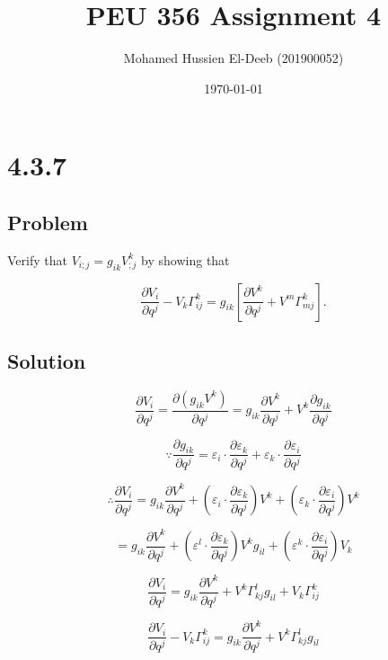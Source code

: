 \documentclass[12pt]{article}
\title{PEU 356 Assignment 4}
\author{Mohamed Hussien El-Deeb (201900052)}
\date{\today}
\begin{document}
\maketitle
\tableofcontents
\hypersetup{linkcolor=RoyalBlue4}

\newpage
\section{4.3.7}

\subsection{Problem}

Verify that \(V_{i ; j}=g_{i k} V_{; j}^k\) by showing that

\[
    \frac{\partial V_i}{\partial q^j}-V_k \Gamma_{i j}^k=g_{i k}\left[\frac{\partial V^k}{\partial q^j}+V^m \Gamma_{m j}^k\right] .
\]

\subsection{Solution}

\[
    \frac{\partial V_i}{\partial q^j} = \frac{\partial \left(g_{ik} V^k\right) }{\partial q^j}
    = g_{ik} \frac{\partial V^k}{\partial q^j} + V^k \frac{\partial g_{ik}}{\partial q^j}
\]

\[
    \because \frac{\partial g_{ik}}{\partial q^j} = \varepsilon_{i} \cdot \frac{\partial \varepsilon_k}{\partial q^j} + \varepsilon_k \cdot \frac{\partial \varepsilon_i}{\partial q^j}
\]

\[
    \therefore \frac{\partial V_i}{\partial q^j} = g_{ik} \frac{\partial V^k}{\partial q^j}
    + \left(\varepsilon_i \cdot \frac{\partial \varepsilon_k}{\partial q^j}\right) V^k
    + \left(\varepsilon_k \cdot \frac{\partial \varepsilon_i}{\partial q^j}\right) V^k
\]

\[
    = g_{ik} \frac{\partial V^k}{\partial q^j}
    + \left(\varepsilon^l \cdot \frac{\partial \varepsilon_k}{\partial q^j}\right) V^k g_{il}
    + \left(\varepsilon^k \cdot \frac{\partial \varepsilon_i}{\partial q^j}\right) V_k
\]

\[
    \frac{\partial V_i}{\partial q^j} = g_{ik} \frac{\partial V^k}{\partial q^j} + V^k \Gamma_{k j}^l g_{il} + V_k \Gamma_{i j}^k
\]

\[
    \frac{\partial V_i}{\partial q^j} - V_k \Gamma_{i j}^k = g_{ik} \frac{\partial V^k}{\partial q^j} + V^k \Gamma_{k j}^l g_{il}
\]
\end{document}
